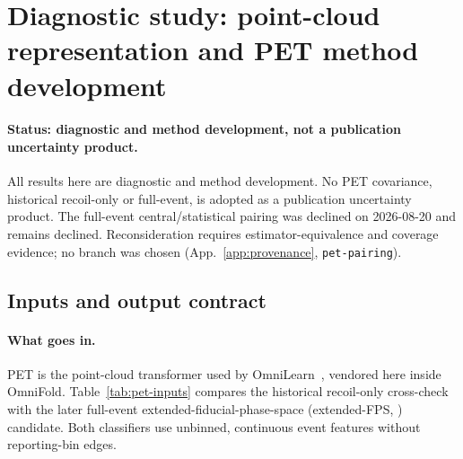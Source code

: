 \section{Diagnostic study: point-cloud representation and PET method development}
\label{sec:pet}

\paragraph{Status: diagnostic and method development, not a publication uncertainty product.} All results here are diagnostic and method development. No PET covariance, historical recoil-only or full-event, is adopted as a publication uncertainty product. The full-event central/statistical pairing was declined on 2026-08-20 and remains declined. Reconsideration requires estimator-equivalence and coverage evidence; no branch was chosen (App.~\ref{app:provenance}, \texttt{pet-pairing}).

\subsection{Inputs and output contract}

\paragraph{What goes in.}
\label{sec:pet-inputs}
PET is the point-cloud transformer used by OmniLearn~\cite{Mikuni:2024qsr}, vendored here inside OmniFold. Table~\ref{tab:pet-inputs} compares the historical recoil-only cross-check with the later full-event extended-fiducial-phase-space (extended-FPS, ) candidate. Both classifiers use unbinned, continuous event features without reporting-bin edges.

